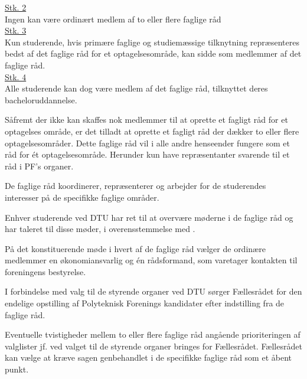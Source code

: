 \underline{Stk. 2} \\
Ingen kan være ordinært medlem af to eller flere faglige råd\\

\underline{Stk. 3} \\
Kun studerende, hvis primære faglige og studiemæssige tilknytning repræsenteres bedst af det faglige råd for et optagelsesområde, kan sidde som medlemmer af det faglige råd.\\

\underline{Stk. 4} \\ 
Alle studerende kan dog være medlem af det faglige råd, tilknyttet deres bacheloruddannelse.\\

\item Såfremt der ikke kan skaffes nok medlemmer til at oprette et fagligt råd for et optagelses område, er det tilladt at oprette et fagligt råd der dækker to eller flere optagelsesområder. Dette faglige råd vil i alle andre henseender fungere som et råd for ét optagelsesområde. Herunder kun have repræsentanter svarende til et råd i PF’s organer.\\

\item De faglige råd koordinerer, repræsenterer og arbejder for de studerendes interesser på de specifikke faglige områder.\\

\item Enhver studerende ved DTU har ret til at overvære møderne i de faglige råd og har taleret til disse møder, i overensstemmelse med .\\

\item På det konstituerende møde i hvert af de faglige råd vælger de ordinære medlemmer en økonomiansvarlig og én rådsformand, som varetager kontakten til foreningens bestyrelse.\\

\item \label{L:faglige:DTUvalg} I forbindelse med valg til de styrende organer ved DTU sørger Fællesrådet for den endelige opstilling af Polyteknisk Forenings kandidater efter indstilling fra de faglige råd.\\

\item Eventuelle tvistigheder mellem to eller flere faglige råd angående prioriteringen af valglister jf.  ved valget til de styrende organer bringes for Fællesrådet. Fællesrådet kan vælge at kræve sagen genbehandlet i de specifikke faglige råd som et åbent punkt.\\

